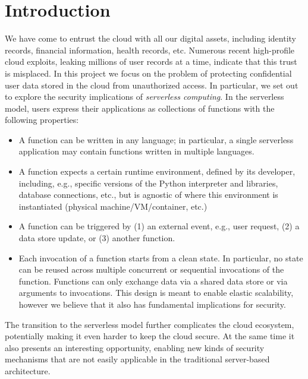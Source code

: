 \documentclass[acmsmall,10pt,review,anonymous]{acmart}\settopmatter{printfolios=true}
\begin{document}
\section{Introduction}

We have come to entrust the cloud with all our digital assets, 
including identity records, financial information, health records, 
etc. Numerous recent high-profile cloud exploits, leaking millions of 
user records at a time, indicate that this trust is misplaced. In this 
project we focus on the problem of protecting confidential user data 
stored in the cloud from unauthorized access. In particular, we set 
out to explore the security implications of \emph{serverless 
computing}.  In the serverless model, users express their applications 
as collections of functions with the following properties:

\begin{itemize}
    \item A function can be written in any language; in particular, a 
        single serverless application may contain functions written in 
        multiple languages.

    \item A function expects a certain runtime environment, defined by 
        its developer, including, e.g., specific versions of the 
        Python interpreter and libraries, database connections, etc., 
        but is agnostic of where this environment is instantiated 
        (physical machine/VM/container, etc.)


    \item A function can be triggered by (1) an external event, e.g., 
        user request, (2) a data store update, or (3) another 
        function.

    \item Each invocation of a function starts from a clean state. In 
        particular, no state can be reused across multiple concurrent 
        or sequential invocations of the function. Functions can only 
        exchange data via a shared data store or via arguments to 
        invocations. This design is meant to enable elastic         
        scalability, however we believe that it also has fundamental 
        implications for security.
\end{itemize}

The transition to the serverless model further complicates the cloud 
ecosystem, potentially making it even harder to keep the cloud secure.  
At the same time it also presents an interesting opportunity, enabling 
new kinds of security mechanisms that are not easily applicable in the 
traditional server-based architecture.
\end{document}
